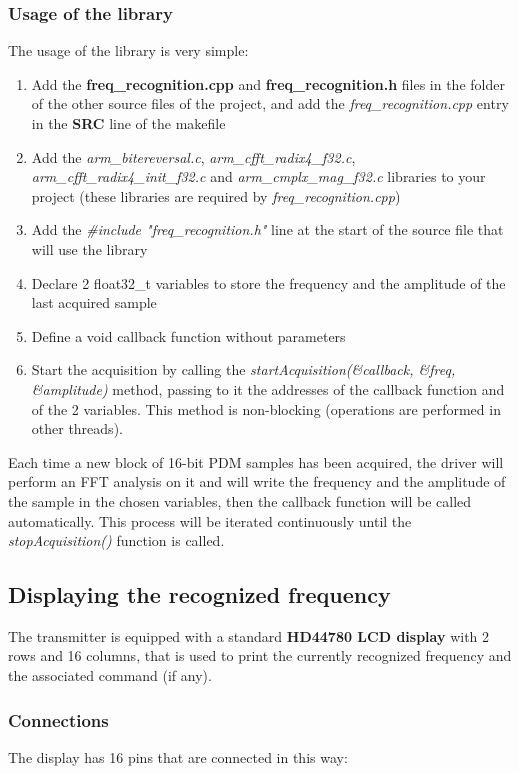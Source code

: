\subsubsection{Usage of the library}
The usage of the library is very simple:
\begin{enumerate}
	\item Add the \textbf{freq\_recognition.cpp} and \textbf{freq\_recognition.h} files in the folder of the other source files of the project, and add the \textit{freq\_recognition.cpp} entry in the \textbf{SRC} line of the makefile
	\item Add the \textit{arm\_bitereversal.c}, \textit{arm\_cfft\_radix4\_f32.c}, \textit{arm\_cfft\_radix4\_init\_f32.c} and \textit{arm\_cmplx\_mag\_f32.c} libraries to your project (these libraries are required by \textit{freq\_recognition.cpp})
	\item Add the \textit{\#include "freq\_recognition.h"} line at the start of the source file that will use the library
	\item Declare 2 float32\_t variables to store the frequency and the amplitude of the last acquired sample
	\item Define a void callback function without parameters
	\item Start the acquisition by calling the \textit{startAcquisition(\&callback, \&freq, \&amplitude)} method, passing to it the addresses of the callback function and of the 2 variables. This method is non-blocking (operations are performed in other threads).

\end{enumerate}
Each time a new block of 16-bit PDM samples has been acquired, the driver will perform an FFT analysis on it and will write the frequency and the amplitude of the sample in the chosen variables, then the callback function will be called automatically. This process will be iterated continuously until the \textit{stopAcquisition()} function is called.

\subsection{Displaying the recognized frequency}
The transmitter is equipped with a standard \textbf{HD44780 LCD display} with 2 rows and 16 columns, that is used to print the currently recognized frequency and the associated command (if any).

\subsubsection{Connections}
The display has 16 pins that are connected in this way:

